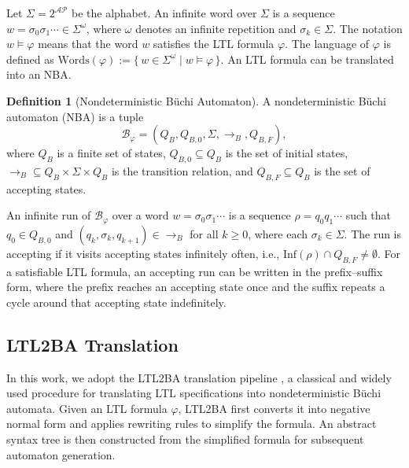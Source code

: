 \documentclass[lettersize,journal]{IEEEtran}
\theoremstyle{italiclemma}
\theoremstyle{italiclemma}
\theoremstyle{definition}
\newtheorem{definition}{Definition}
\begin{document}
Let $\Sigma = 2^{\mathcal{AP}}$ be the alphabet. An infinite word over $\Sigma$ is a sequence $w=\sigma_0\sigma_1\cdots \in \Sigma^\omega$, where $\omega$ denotes an infinite repetition and  $\sigma_k \in \Sigma$. The notation $w \models \varphi$ means that the word $w$ satisfies the LTL formula $\varphi$.  The language of $\varphi$ is defined as $\mathrm{Words}(\varphi) := \{\, w \in \Sigma^\omega \mid w \models \varphi \,\}.$
An LTL formula can be translated into an NBA.
\begin{definition}[Nondeterministic Büchi Automaton]
A nondeterministic Büchi automaton (NBA) is a tuple
$$
\mathcal{B}_{\varphi}=(Q_B,Q_{B,0},\Sigma,\rightarrow_B,Q_{B,F}),
$$
where $Q_B$ is a finite set of states, $Q_{B,0} \subseteq Q_B$ is the set of initial states, $\rightarrow_B \subseteq Q_B \times \Sigma \times Q_B$ is the transition relation, and $Q_{B,F} \subseteq Q_B$ is the set of accepting states.
\end{definition}
An infinite run of $\mathcal{B}_\varphi$ over a word $w=\sigma_0\sigma_1\cdots$ is a sequence $\rho=q_0q_1\cdots$ such that $q_0 \in Q_{B,0}$ and $(q_k,\sigma_k,q_{k+1}) \in \rightarrow_B$ for all $k \ge 0$, where each $\sigma_k \in \Sigma$. The run is accepting if it visits accepting states infinitely often, i.e., $\mathrm{Inf}(\rho)\cap Q_{B,F} \neq \emptyset$. For a satisfiable LTL formula, an accepting run can be written in the prefix--suffix form, where the prefix reaches an accepting state once and the suffix repeats a cycle around that accepting state indefinitely.

\subsection{LTL2BA Translation}

In this work, we adopt the LTL2BA translation pipeline \cite{Gastin2001FastLT}, a classical and widely used procedure for translating LTL specifications into nondeterministic Büchi automata. Given an LTL formula $\varphi$, LTL2BA first converts it into negative normal form and applies rewriting rules to simplify the formula. An abstract syntax tree is then constructed from the simplified formula for subsequent automaton generation.

\end{document}
